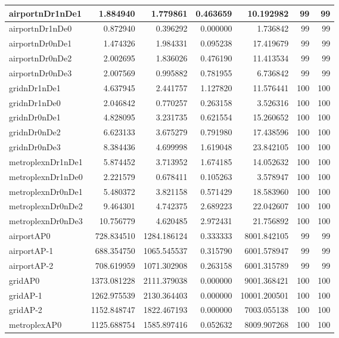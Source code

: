 \begin{longtable}{|l|r|r|r|r|r|r|}
\endlastfoot
airportnDr1nDe1 & 1.884940 & 1.779861 & 0.463659 & 10.192982 & 99 & 99 \\ \hline
airportnDr1nDe0 & 0.872940 & 0.396292 & 0.000000 & 1.736842 & 99 & 99 \\ \hline
airportnDr0nDe1 & 1.474326 & 1.984331 & 0.095238 & 17.419679 & 99 & 99 \\ \hline
airportnDr0nDe2 & 2.002695 & 1.836026 & 0.476190 & 11.413534 & 99 & 99 \\ \hline
airportnDr0nDe3 & 2.007569 & 0.995882 & 0.781955 & 6.736842 & 99 & 99 \\ \hline
gridnDr1nDe1 & 4.637945 & 2.441757 & 1.127820 & 11.576441 & 100 & 100 \\ \hline
gridnDr1nDe0 & 2.046842 & 0.770257 & 0.263158 & 3.526316 & 100 & 100 \\ \hline
gridnDr0nDe1 & 4.828095 & 3.231735 & 0.621554 & 15.260652 & 100 & 100 \\ \hline
gridnDr0nDe2 & 6.623133 & 3.675279 & 0.791980 & 17.438596 & 100 & 100 \\ \hline
gridnDr0nDe3 & 8.384436 & 4.699998 & 1.619048 & 23.842105 & 100 & 100 \\ \hline
metroplexnDr1nDe1 & 5.874452 & 3.713952 & 1.674185 & 14.052632 & 100 & 100 \\ \hline
metroplexnDr1nDe0 & 2.221579 & 0.678411 & 0.105263 & 3.578947 & 100 & 100 \\ \hline
metroplexnDr0nDe1 & 5.480372 & 3.821158 & 0.571429 & 18.583960 & 100 & 100 \\ \hline
metroplexnDr0nDe2 & 9.464301 & 4.742375 & 2.689223 & 22.042607 & 100 & 100 \\ \hline
metroplexnDr0nDe3 & 10.756779 & 4.620485 & 2.972431 & 21.756892 & 100 & 100 \\ \hline
airportAP0 & 728.834510 & 1284.186124 & 0.333333 & 8001.842105 & 99 & 99 \\ \hline
airportAP-1 & 688.354750 & 1065.545537 & 0.315790 & 6001.578947 & 99 & 99 \\ \hline
airportAP-2 & 708.619959 & 1071.302908 & 0.263158 & 6001.315789 & 99 & 99 \\ \hline
gridAP0 & 1373.081228 & 2111.379038 & 0.000000 & 9001.368421 & 100 & 100 \\ \hline
gridAP-1 & 1262.975539 & 2130.364403 & 0.000000 & 10001.200501 & 100 & 100 \\ \hline
gridAP-2 & 1152.848747 & 1822.467193 & 0.000000 & 7003.055138 & 100 & 100 \\ \hline
metroplexAP0 & 1125.688754 & 1585.897416 & 0.052632 & 8009.907268 & 100 & 100 \\ \hline

\end{longtable}
